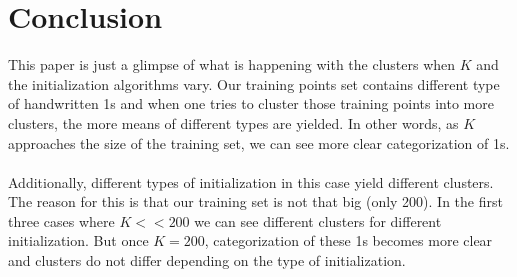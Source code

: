 \documentclass[a4paper, 11pt]{report}
\begin{document}
\section{Conclusion}
This paper is just a glimpse of what is happening with the clusters when $K$ and the initialization algorithms vary. Our training points set contains different type of handwritten 1s and when one tries to cluster those training points into more clusters, the more means of different types are yielded. In other words, as $K$ approaches the size of the training set, we can see more clear categorization of 1s.\\ \\
Additionally, different types of initialization in this case yield different clusters. The reason for this is that our training set is not that big (only 200). In the first three cases where $K<<200$ we can see different clusters for different initialization. But once $K=200$, categorization of these 1s becomes more clear and clusters do not differ depending on the type of initialization. 
\end{document}

